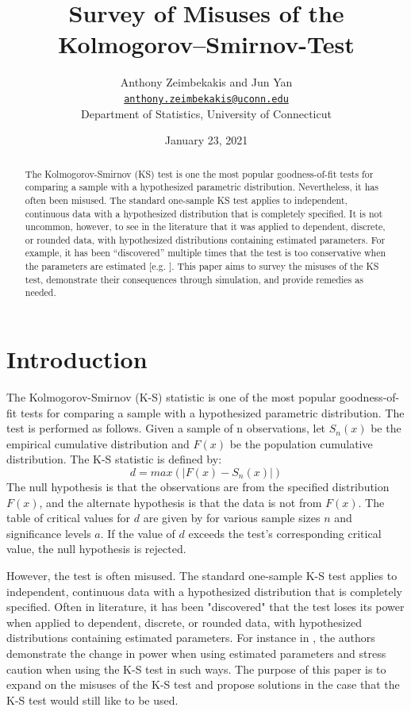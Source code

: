\documentclass[12pt, letterpaper, titlepage]{article}
\title{Survey of Misuses of the Kolmogorov–Smirnov-Test}
\author{Anthony Zeimbekakis and Jun Yan\\
\href{mailto:anthony.zeimbekakis@uconn.edu}{\nolinkurl{anthony.zeimbekakis@uconn.edu}}\\
Department of Statistics, University of Connecticut}
\date{January 23, 2021}
\begin{document}
\maketitle

\doublespace

\begin{abstract}
The Kolmogorov-Smirnov (KS) test is one the most popular goodness-of-fit tests for comparing a sample with a hypothesized parametric distribution. Nevertheless, it has often been misused. The standard one-sample KS test applies to independent, continuous data with a hypothesized distribution that is completely specified. It is not uncommon, however, to see in the literature that it was applied to dependent, discrete, or rounded data, with hypothesized distributions containing estimated parameters. For example, it has been “discovered” multiple times that the test is too conservative when the parameters are estimated [e.g. \citet{Steinskog}]. This paper aims to survey the misuses of the KS test, demonstrate their consequences through simulation, and provide remedies as needed.
\end{abstract}


\hypertarget{sec:intro}{%
\section{Introduction}\label{sec:intro}}

The Kolmogorov-Smirnov (K-S) statistic is one of the most popular goodness-of-fit tests for comparing a sample with a hypothesized parametric distribution. The test is performed as follows. Given a sample of n observations, let $S_{n}(x)$ be the empirical cumulative distribution and $F(x)$ be the population cumulative distribution. The K-S statistic is defined by: \[d = max(\lvert F(x)-S_{n}(x) \rvert)\] The null hypothesis is that the observations are from the specified distribution $F(x)$, and the alternate hypothesis is that the data is not from $F(x)$. The table of critical values for $d$ are given by \citet{Massey} for various sample sizes $n$ and significance levels $a$. If the value of $d$ exceeds the test's corresponding critical value, the null hypothesis is rejected.

However, the test is often misused. The standard one-sample K-S test applies to independent, continuous data with a hypothesized distribution that is completely specified. Often in literature, it has been "discovered" that the test loses its power when applied to dependent, discrete, or rounded data, with hypothesized distributions containing estimated parameters. For instance in \citet{Steinskog}, the authors demonstrate the change in power when using estimated parameters and stress caution when using the K-S test in such ways. The purpose of this paper is to expand on the misuses of the K-S test and propose solutions in the case that the K-S test would still like to be used.
\end{document}
